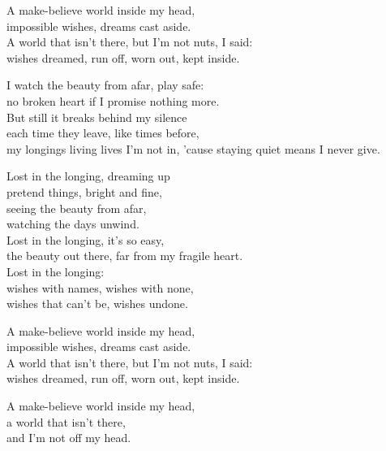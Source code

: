 \begin{lyrics}
A make-believe world inside my head,\\
impossible wishes, dreams cast aside.\\
A world that isn't there, but I'm not nuts, I said:\\
wishes dreamed, run off, worn out, kept inside.

I watch the beauty from afar, play safe:\\
no broken heart if I promise nothing more.\\
But still it breaks behind my silence\\
each time they leave, like times before,\\
my longings living lives I'm not in,
'cause staying quiet means I never give.

Lost in the longing, dreaming up\\
pretend things, bright and fine,\\
seeing the beauty from afar,\\
watching the days unwind.\\
Lost in the longing, it's so easy,\\
the beauty out there, far from my fragile heart.\\
Lost in the longing:\\
wishes with names, wishes with none,\\
wishes that can't be, wishes undone.

A make-believe world inside my head,\\
impossible wishes, dreams cast aside.\\
A world that isn't there, but I'm not nuts, I said:\\
wishes dreamed, run off, worn out, kept inside.

A make-believe world inside my head,\\
a world that isn't there,\\
and I'm not off my head.
\end{lyrics}

